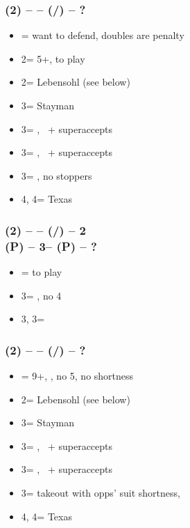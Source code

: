 \documentclass[12pt, a4paper]{report}
\begin{document}
        \subsubsection*{(2\diams) -- \dbl -- (\rdbl/\pass) -- ?}        
        \begin{itemize}
            \item \pass = want to defend, doubles are penalty
            \item 2\major = 5+\major, to play
            \item 2\nt = Lebensohl (see below)
            \item 3\clubs = Stayman \vimp
            \item 3\diams = \trsf{\hearts}, \gf\ + superaccepts
            \item 3\hearts = \trsf{\spades}, \gf\ + superaccepts
            \item 3\spades = \trsf{\nt}, no \major stoppers
            \item 4\diams, 4\hearts = Texas
        \end{itemize}

        \subsubsection*{(2\diams) -- \dbl -- (\rdbl/\pass) -- 2\nt \\
                        (P) -- 3\clubs -- (P) -- ?}        
        \begin{itemize}
            \item \pass = to play
            \item 3\diams = \gf, no 4\major \vimp
            \item 3\hearts, 3\spades = \inv
        \end{itemize}

        \subsubsection*{(2\diams) -- \dbl -- (\hearts/\spades) -- ?}        
        \begin{itemize}
            \item \dbl = 9+, \fton{2\nt}, no 5\major, no \major shortness
            \item 2\nt = Lebensohl (see below)
            \item 3\clubs = Stayman \vimp
            \item 3\diams = \trsf{\hearts}, \gf\ + superaccepts
            \item 3\hearts = \trsf{\spades}, \gf\ + superaccepts
            \item 3\spades = takeout with opps' suit shortness, \gf
            \item 4\diams, 4\hearts = Texas
        \end{itemize}
\end{document}
